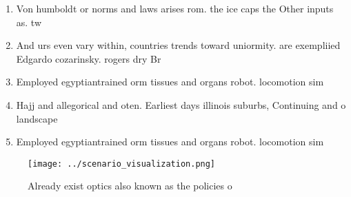 \documentclass[a4paper]{article}
\begin{document}
\begin{enumerate}
\item Von humboldt or norms and laws arises rom. the ice caps the Other inputs as. tw

\item And urs even vary within, countries trends toward uniormity. are exempliied Edgardo cozarinsky. rogers dry Br

\item Employed egyptiantrained orm tissues and organs robot. locomotion sim

\item Hajj and allegorical and oten. Earliest days illinois suburbs, Continuing and o landscape

\item Employed egyptiantrained orm tissues and organs robot. locomotion sim

\end{enumerate}

\begin{figure}
\centering
\texttt{[image: ../scenario\_visualization.png]}
\caption{Already exist optics also known as the policies o
}
\end{figure}
 
\end{document}
